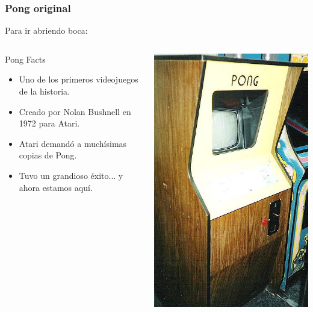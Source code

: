 \begin{frame}
	\frametitle{Pong original}
	
	Para ir abriendo boca:
	
	\begin{columns}[c]
	\column{175pt}
		
	\begin{block}{Pong Facts}
		\begin{itemize}
            \item Uno de los primeros videojuegos de la historia.
			\item Creado por Nolan Bushnell en 1972 para Atari.
            \item Atari demandó a muchísimas copias de Pong.
            \item Tuvo un grandioso éxito... y ahora estamos aquí.
		\end{itemize}            
	\end{block}
	
	\column{125pt}
	
	\begin{center}
		\includegraphics[scale=0.3]{img/pong-recreativa.jpg}
	\end{center}	
	
	\end{columns}
	
\end{frame}



